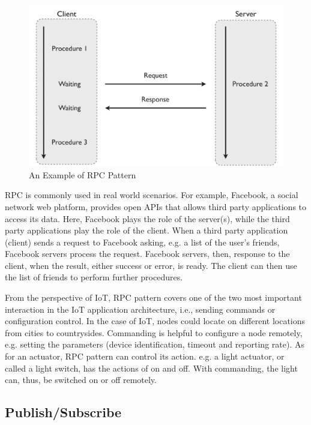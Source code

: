 \begin{figure}[ht]
  \begin{center}
    \includegraphics[width=1\textwidth]{images/RPC-pattern.pdf}
    \caption{An Example of RPC Pattern}
    \label{fig:RPC-pattern}
  \end{center}
\end{figure}

RPC is commonly used in real world scenarios. For example, Facebook, a social network web platform, provides open APIs that allows third party applications to access its data. Here, Facebook plays the role of the server(s), while the third party applications play the role of the client. When a third party application (client) sends a request to Facebook asking, e.g. a list of the user's friends, Facebook servers process the request. Facebook servers, then, response to the client, when the result, either success or error, is ready. The client can then use the list of friends to perform further procedures. 

From the perspective of IoT, RPC pattern covers one of the two most important interaction in the IoT application architecture, i.e., sending commands or configuration control. In the case of IoT, nodes could locate on different locations from cities to countrysides. Commanding is helpful to configure a node remotely, e.g. setting the parameters (device identification, timeout and reporting rate). As for an actuator, RPC pattern can control its action. e.g. a light actuator, or called a light switch, has the actions of on and off. With commanding, the light can, thus, be switched on or off remotely.

\subsection{Publish/Subscribe}

